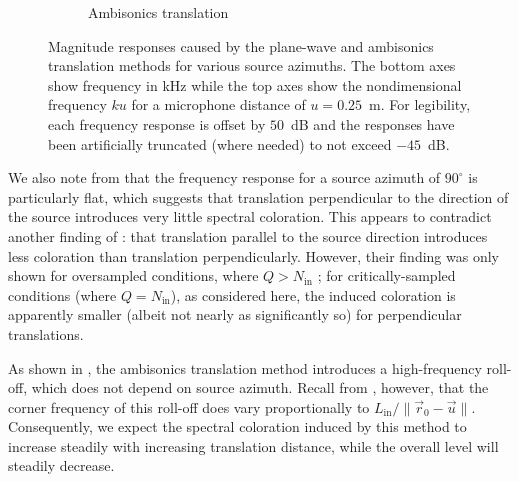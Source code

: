 \begin{figure}[t]
\begin{subfigure}[b]{0.49\textwidth}
        		\caption{Ambisonics translation}
        		\label{fig:07_Characterization_Extrapolation:Azimuth_Dependence:SRE}
    	\end{subfigure}
	
	\caption[Magnitude responses across azimuths for each extrapolation method.]{
	Magnitude responses caused by the plane-wave and ambisonics translation methods for various source azimuths.
  The bottom axes show frequency in kHz while the top axes show the nondimensional frequency $ku$ for a microphone distance of $u = 0.25$~m.
  For legibility, each frequency response is offset by $50$~dB and the responses have been artificially truncated (where needed) to not exceed $-45$~dB.}
	\label{fig:07_Characterization_Extrapolation:Azimuth_Dependence}
\end{figure} %

We also note from  that the frequency response for a source azimuth of $90^\circ$ is particularly flat, which suggests that translation perpendicular to the direction of the source introduces very little spectral coloration.
This appears to contradict another finding of \citet{HahnSpors2015b}: that translation parallel to the source direction introduces less coloration than translation perpendicularly.
However, their finding was only shown for oversampled conditions, where $Q > N_\text{in}$ \citep[cf.~Fig.~7]{HahnSpors2015b}; for critically-sampled conditions (where $Q = N_\text{in}$), as considered here, the induced coloration is apparently smaller (albeit not nearly as significantly so) for perpendicular translations.

As shown in , the ambisonics translation method introduces a high-frequency roll-off, which does not depend on source azimuth.
Recall from , however, that the corner frequency of this roll-off does vary proportionally to $L_\text{in} / \| \vec{r}_0 - \vec{u} \|$.
Consequently, we expect the spectral coloration induced by this method to increase steadily with increasing translation distance, while the overall level will steadily decrease.